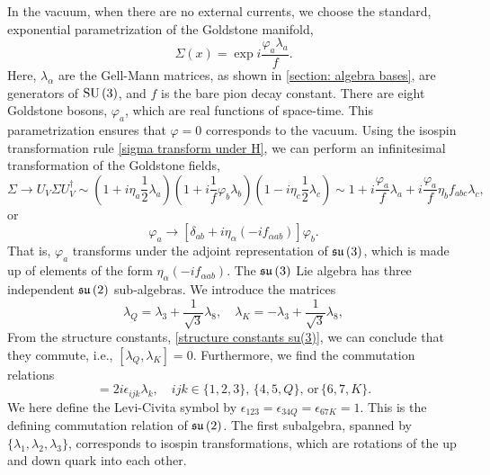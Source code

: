 %
In the vacuum, when there are no external currents, we choose the standard, exponential parametrization of the Goldstone manifold,
%
\begin{equation}
    \Sigma(x) = \exp{i\frac{\varphi_a \lambda_a}{f}}.
\end{equation}
%
Here, $\lambda_\alpha$ are the Gell-Mann matrices, as shown in \autoref{section: algebra bases}, are generators of $\text{SU}\left(3\right)$, and $f$ is the bare pion decay constant.
There are eight Goldstone bosons, $\varphi_a$, which are real functions of space-time.
This parametrization ensures that $\varphi = 0$ corresponds to the vacuum.
Using the isospin transformation rule \autoref{sigma transform under H}, we can perform an infinitesimal transformation of the Goldstone fields,
%
\begin{equation}
    \Sigma \rightarrow U_V \Sigma U_V^\dagger
    \sim
    \left(1 + i \eta_a \frac{1}{2} \lambda_a\right)
    \left(1 + i \frac{1}{f} \varphi_b  \lambda_b\right)
    \left(1 - i \eta_c \frac{1}{2} \lambda_c\right)
    \sim
    1 + i\frac{\varphi_a}{f} \lambda_a + i \frac{\varphi_a}{f} \eta_b f_{abc} \lambda_c,
\end{equation}
%
or
%
\begin{equation}
    \varphi_a \rightarrow [\delta_{ab} + i\eta_\alpha (-if_{\alpha ab})] \varphi_b.
\end{equation}
%
That is, $\varphi_a$ transforms under the adjoint representation of $\mathfrak{su}\left(3\right)$, which is made up of elements of the form $\eta_\alpha (-i f_{\alpha ab})$.
The $\mathfrak{su}\left(3\right)$ Lie algebra has three independent $\mathfrak{su}\left(2\right)$ sub-algebras.
We introduce the matrices
%
\begin{equation}
    \lambda_Q = \lambda_3 + \frac{1}{\sqrt{3}}\lambda_8, \quad
    \lambda_K = -\lambda_3 + \frac{1}{\sqrt{3}}\lambda_8,
\end{equation}
%
From the structure constants, \autoref{structure constants su(3)}, we can conclude that they commute, i.e., $[\lambda_Q, \lambda_K] = 0$.
Furthermore, we find the commutation relations
%
\begin{equation}
    [\lambda_i, \lambda_j] = 2i \epsilon_{ijk} \lambda_k,\quad
    ijk \in \{1, 2, 3\}, \, \{4, 5, Q\}, \, \text{or} \, \{6, 7, K\}.
\end{equation}
%
We here define the Levi-Civita symbol by $\epsilon_{123} = \epsilon_{34Q} =\epsilon_{67K} = 1$.
This is the defining commutation relation of $\mathfrak{su}\left(2\right)$.
The first subalgebra, spanned by $\{ \lambda_1, \lambda_2, \lambda_3 \}$, corresponds to isospin transformations, which are rotations of the up and down quark into each other.
